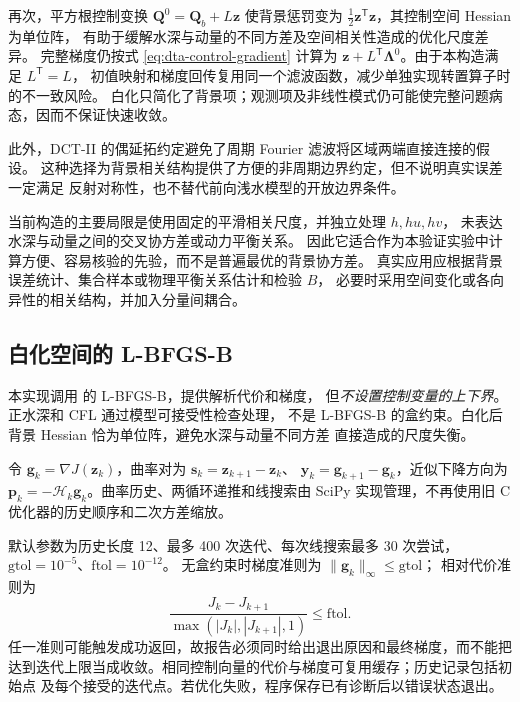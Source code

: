 \documentclass[12pt,a4paper]{article}
\newcommand{\Q}{\mathbf{Q}}
\newcommand{\LL}{\bm{\Lambda}}
\newcommand{\trans}{^{\mathsf T}}
\begin{document}
再次，平方根控制变换 $\Q^0=\Q_b+L\mathbf z$ 使背景惩罚变为
$\tfrac12\mathbf z\trans\mathbf z$，其控制空间 Hessian 为单位阵，
有助于缓解水深与动量的不同方差及空间相关性造成的优化尺度差异。
完整梯度仍按式 \eqref{eq:dta-control-gradient} 计算为
$\mathbf z+L\trans\LL^0$。由于本构造满足 $L\trans=L$，
初值映射和梯度回传复用同一个滤波函数，减少单独实现转置算子时的不一致风险。
白化只简化了背景项；观测项及非线性模式仍可能使完整问题病态，因而不保证快速收敛。

此外，DCT-II 的偶延拓约定避免了周期 Fourier 滤波将区域两端直接连接的假设。
这种选择为背景相关结构提供了方便的非周期边界约定，但不说明真实误差一定满足
反射对称性，也不替代前向浅水模型的开放边界条件。

当前构造的主要局限是使用固定的平滑相关尺度，并独立处理 $h,hu,hv$，
未表达水深与动量之间的交叉协方差或动力平衡关系。
因此它适合作为本验证实验中计算方便、容易核验的先验，而不是普遍最优的背景协方差。
真实应用应根据背景误差统计、集合样本或物理平衡关系估计和检验 $B$，
必要时采用空间变化或各向异性的相关结构，并加入分量间耦合。

\subsection{白化空间的 L-BFGS-B}

本实现调用  的 L-BFGS-B，提供解析代价和梯度，
但\emph{不设置控制变量的上下界}。正水深和 CFL 通过模型可接受性检查处理，
不是 L-BFGS-B 的盒约束。白化后背景 Hessian 恰为单位阵，避免水深与动量不同方差
直接造成的尺度失衡。

令 $\mathbf g_k=\nabla J(\mathbf z_k)$，曲率对为
$\mathbf s_k=\mathbf z_{k+1}-\mathbf z_k$、
$\mathbf y_k=\mathbf g_{k+1}-\mathbf g_k$，近似下降方向为
$\mathbf p_k=-\mathcal H_k\mathbf g_k$。曲率历史、两循环递推和线搜索由 SciPy
实现管理，不再使用旧 C 优化器的历史顺序和二次方差缩放。

默认参数为历史长度 12、最多 400 次迭代、每次线搜索最多 30 次尝试，
$\mathrm{gtol}=10^{-5}$、$\mathrm{ftol}=10^{-12}$。
无盒约束时梯度准则为 $\|\mathbf g_k\|_\infty\le\mathrm{gtol}$；
相对代价准则为
\begin{equation}
 \frac{J_k-J_{k+1}}{\max(|J_k|,|J_{k+1}|,1)}\le\mathrm{ftol}.
 \label{eq:dta-stopping}
\end{equation}
任一准则可能触发成功返回，故报告必须同时给出退出原因和最终梯度，而不能把
达到迭代上限当成收敛。相同控制向量的代价与梯度可复用缓存；历史记录包括初始点
及每个接受的迭代点。若优化失败，程序保存已有诊断后以错误状态退出。
\end{document}
